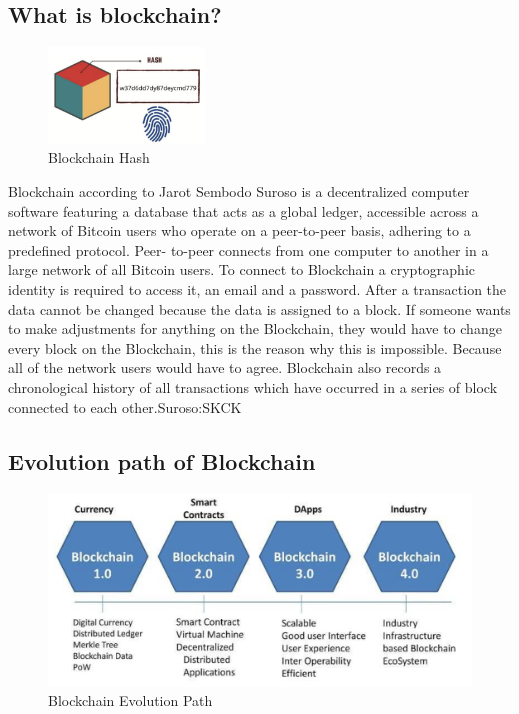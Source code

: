 \documentclass[10pt,english,a4paper]{article}
\begin{document}
\subsection{What is blockchain?}
\begin{figure}
  \centering
  \includegraphics[width=0.37\textwidth]{Blockchain-hash.png} 
  \caption{Blockchain Hash\cite{Jain:Criminal:record}}
\end{figure} 
Blockchain according to Jarot Sembodo Suroso\cite{Suroso:SKCK} is a decentralized computer software featuring a database that acts as a global ledger, accessible across a network of Bitcoin users who operate on a peer-to-peer basis, adhering to a predefined protocol. Peer- to-peer connects from one computer to another in a large network of all Bitcoin users. To connect to Blockchain a cryptographic identity is required to access it, an email and a password. After a transaction the data cannot be changed because the data is assigned to a block. If someone wants to make adjustments for anything on the Blockchain, they would have to change every block on the Blockchain, this is  the reason why this is impossible. Because all of the network users would have to agree. Blockchain also records a chronological history of all transactions which have occurred in a series of block connected to each other.{Suroso:SKCK}

\subsection{Evolution path of Blockchain}
\begin{figure}[h]
    \centering
    \includegraphics[scale=0.4]{Blockchain-evolution.png}
    \caption{Blockchain Evolution Path \cite{Suroso:SKCK}}
    \label{histogram}
\end{figure}
\end{document}
